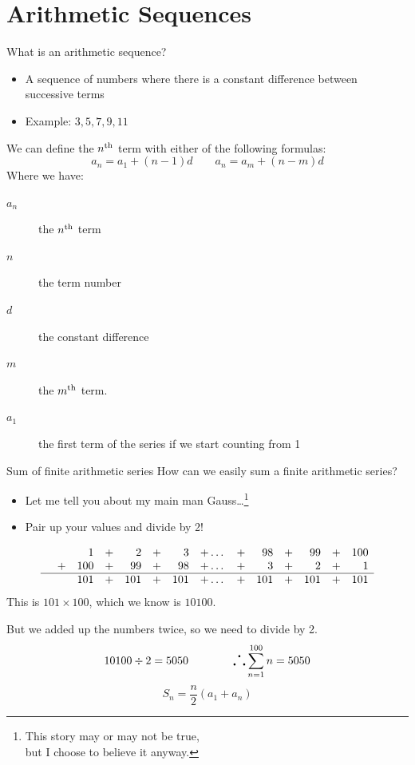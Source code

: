 	\section{Arithmetic Sequences}
	\begin{namedframe}{What is an arithmetic sequence?}
		\begin{itemize}
			\item A sequence of numbers where there is a constant difference between successive terms
			\item Example: $3,5,7,9,11$
		\end{itemize}
		\pause
		We can define the $n\textsuperscript{th}$ term with either of the following formulas:
		\[a_n = a_1 + (n-1)d \qquad a_n = a_m + (n-m)d\]
		Where we have:
		\begin{description}
			\item[$a_n$] the $n\textsuperscript{th}$ term
			\item[$n$] the term number
			\item[$d$] the constant difference
			\item[$m$] the $m\textsuperscript{th}$ term.
			\item[$a_1$] the first term of the series if we start counting from 1
		\end{description}
	\end{namedframe}
	\begin{namedframe}{Sum of finite arithmetic series}
		How can we easily sum a finite arithmetic series?
		\begin{itemize}[<+(1)->]
			\item Let me tell you about my main man Gauss\dots\footnote{This story may or may not be true,\\but I choose to believe it anyway.}
			\item Pair up your values and divide by 2!
		\end{itemize}
		\pause
		\begin{equation*}
			\begin{array}{lrrrrrrrrrrrrrrrrrrrrr}
				&    &1 &+  &2  &+  &3 &+  \dots &+ &98  &+ &99  &+ &100\\
				&+ &100 &+ &99  &+ &98 &+  \dots &+  &3  &+  &2  &+ &1\\\hline
				&  &101 &+ &101 &+ &101 &+ \dots &+ &101 &+ &101 &+ &101
			\end{array}
		\end{equation*}
		This is $101 \times 100$, which we know is $10100$.

		But we added up the numbers twice, so we need to divide by 2.
		\[10100 \div 2 = 5050 \qquad\qquad \text{\LARGE$\therefore$}\sum_{n=1}^{100}n = 5050\]
		\[S_n = \frac{n}{2}(a_1 + a_n)\]
	\end{namedframe}
